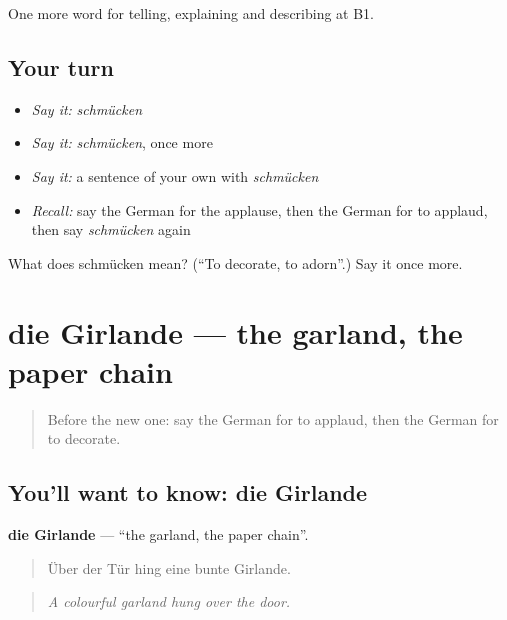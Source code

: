 \begin{grammarlens}[title={What you've built}]
One more word for telling, explaining and describing at B1.
\end{grammarlens}

\subsection*{Your turn}
\begin{itemize}
\raggedright
  \item \emph{Say it:} \emph{schmücken}
  \item \emph{Say it:} \emph{schmücken}, once more
  \item \emph{Say it:} a sentence of your own with \emph{schmücken}
  \item \emph{Recall:} say the German for the applause, then the German for to applaud, then say \emph{schmücken} again
\end{itemize}

\begin{tcolorbox}[breakable,colback=teal!4,colframe=teal!35!black,title={Before you move on}]
What does schmücken mean? (\textquotedblleft{}To decorate, to adorn\textquotedblright{}.) Say it once more.
\end{tcolorbox}
\section[die Girlande]{die Girlande — the garland, the paper chain}

\label{lesson:GE-C309-girlande}



\begin{quote}
Before the new one: say the German for to applaud, then the German for to decorate.
\end{quote}

\subsection*{You'll want to know: die Girlande}
\textbf{die Girlande} — \textquotedblleft{}the garland, the paper chain\textquotedblright{}.

\begin{quote}
Über der Tür hing eine bunte Girlande.
\end{quote}

\begin{quote}
\emph{A colourful garland hung over the door.}
\end{quote}

